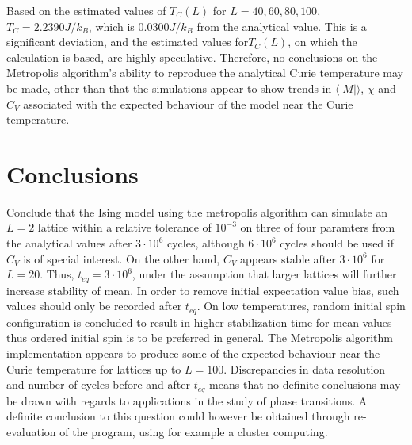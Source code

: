\documentclass[%
oneside,                 %
final,                   %
10pt]{article}
\begin{document}
Based on the estimated values of $T_C(L)$ for $L=40,60,80,100$, $T_C=2.2390 J/k_B$, which is $0.0300 J/k_B$ from the analytical value. This is a significant deviation, and the estimated values for$T_C(L)$, on which the calculation is based, are highly speculative. Therefore, no conclusions on the Metropolis algorithm's ability to reproduce the analytical Curie temperature may be made, other than that the simulations appear to show trends in $\langle |M| \rangle$, $\chi$ and $C_V$ associated with the expected behaviour of the model near the Curie temperature.

\section{Conclusions}
Conclude that the Ising model using the metropolis algorithm can simulate an $L=2$ lattice within a relative tolerance of $10^{-3}$ on three of four paramters from the analytical values after $3 \cdot 10^6$ cycles, although $6 \cdot 10^6$ cycles should be used if $C_V$ is of special interest. On the other hand, $C_V$ appears stable after $3\cdot 10^6$ for $L=20$.   Thus, $t_{eq}=3\cdot 10^6$, under the assumption that larger lattices will further increase stability of mean. In order to remove initial expectation value bias, such values should only be recorded after $t_{eq}$. On low temperatures, random initial spin configuration is concluded to result in higher stabilization time for mean values - thus ordered initial spin is to be preferred in general. The Metropolis algorithm implementation appears to produce some of the expected behaviour near the Curie temperature for lattices up to $L=100$. Discrepancies in data resolution and number of cycles before and after $t_{eq}$ means that no definite conclusions may be drawn with regards to applications in the study of phase transitions. A definite conclusion to this question could however be obtained through re-evaluation of the program, using for example a cluster computing.



\end{document}
